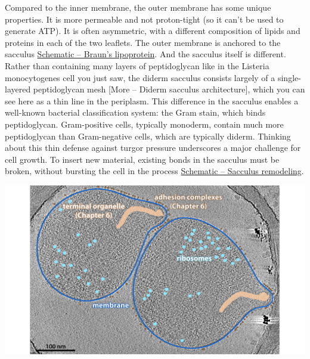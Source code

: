 \documentclass[]{tufte-book}
\begin{document}
Compared to the inner membrane, the outer membrane has some unique
properties. It is more permeable and not proton-tight (so it can't be
used to generate ATP). It is often asymmetric, with a different
composition of lipids and proteins in each of the two leaflets. The
outer membrane is anchored to the sacculus
\protect\hyperlink{fig:2-3-1}{Schematic -- Braun's lipoprotein}. And the
sacculus itself is different. Rather than containing many layers of
peptidoglycan like in the Listeria monocytogenes cell you just saw, the
diderm sacculus consists largely of a single-layered peptidoglycan mesh
{[}More -- Diderm sacculus architecture{]}, which you can see here as a
thin line in the periplasm. This difference in the sacculus enables a
well-known bacterial classification system: the Gram stain, which binds
peptidoglycan. Gram-positive cells, typically monoderm, contain much
more peptidoglycan than Gram-negative cells, which are typically diderm.
Thinking about this thin defense against turgor pressure underscores a
major challenge for cell growth. To insert new material, existing bonds
in the sacculus must be broken, without bursting the cell in the process
\protect\hyperlink{fig:2-3-2}{Schematic -- Sacculus remodeling}.

\includegraphics{img/02_static/2_1_Mgenitalium}
\end{document}
